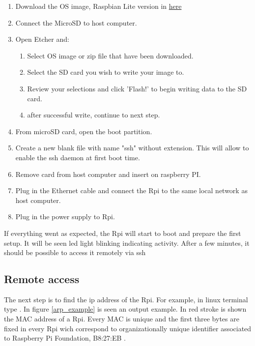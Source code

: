\begin{enumerate}
	\tightlist
	\item Download the \gls{OS} image, Raspbian Lite version in \href{https://www.raspberrypi.org/downloads/raspbian/}{here}
	\item Connect the MicroSD to host computer.
	\item Open Etcher and:
	\begin{enumerate}
		\item Select \gls{OS} image or zip file that have been downloaded.
		\item Select the SD card you wish to write your image to.
		\item Review your selections and click 'Flash!' to begin writing data to the SD card.
		\item after successful write, continue to next step.
	\end{enumerate}
	\item From microSD card, open the boot partition.
	\item Create a new blank file with name "ssh" without extension. This will allow to enable the ssh daemon at first boot time.
	\item Remove card from host computer and insert on raspberry PI.
	\item Plug in the Ethernet cable and connect the \gls{Rpi} to the same  local network as host computer.
	\item Plug in the power supply to \gls{Rpi}.
\end{enumerate}

If everything went as expected, the \gls{Rpi} will start to boot and prepare the first setup. It will be seen led light blinking indicating activity. After a few minutes, it should be possible to access it remotely via ssh


\subsection{Remote access}
The next step is to find the ip address of the \gls{Rpi}. For example, in linux terminal type . In figure \ref{arp_example} is seen an output example. In red stroke is shown the \gls{MAC} address of a \gls{Rpi}. Every \gls{MAC} is unique and the first three bytes are fixed in every \gls{Rpi} wich correspond to organizationally unique identifier \cite{mac_wiki} associated to Raspberry Pi Foundation, B8:27:EB \cite{wireshark_mac}.

